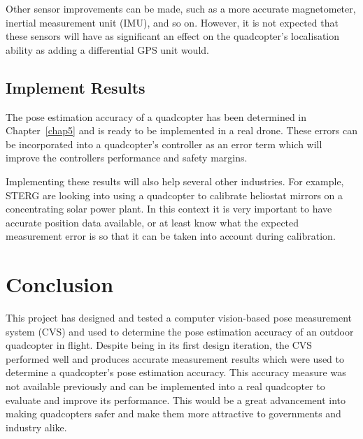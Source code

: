 Other sensor improvements can be made, such as a more accurate magnetometer, inertial measurement unit (IMU), and so on. However, it is not expected that these sensors will have as significant an effect on the quadcopter's localisation ability as adding a differential GPS unit would. 

\subsection{Implement Results}

The pose estimation accuracy of a quadcopter has been determined in Chapter~\ref{chap5} and is ready to be implemented in a real drone. These errors can be incorporated into a quadcopter's controller as an error term which will improve the controllers performance and safety margins. 

Implementing these results will also help several other industries. For example, STERG are looking into using a quadcopter to calibrate heliostat mirrors on a concentrating solar power plant. In this context it is very important to have accurate position data available, or at least know what the expected measurement error is so that it can be taken into account during calibration. 



\section{Conclusion}

This project has designed and tested a computer vision-based pose measurement system (CVS) and used to determine the pose estimation accuracy of an outdoor quadcopter in flight. Despite being in its first design iteration, the CVS performed well and produces accurate measurement results which were used to determine a quadcopter's pose estimation accuracy. This accuracy measure was not available previously and can be implemented into a real quadcopter to evaluate and improve its performance. This would be a great advancement into making quadcopters safer and make them more attractive to governments and industry alike. 

